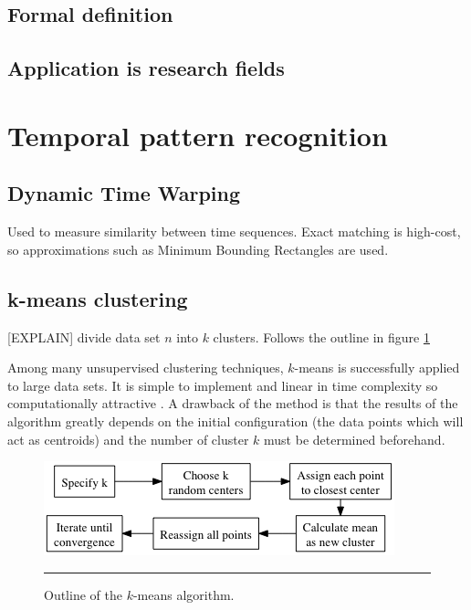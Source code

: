 
\subsection{Formal definition}






\subsection{Application is research fields}



\section{Temporal pattern recognition}

\subsection{Dynamic Time Warping}
Used to measure similarity between time sequences. Exact matching is
high-cost, so approximations such as Minimum Bounding Rectangles are used.

\subsection{k-means clustering}
[EXPLAIN] divide data set $n$ into $k$ clusters. Follows the outline in figure \ref{fig:k_means}

Among many unsupervised clustering techniques, $k$-means is successfully
applied to large data sets. It is simple to implement and linear in time
complexity so computationally attractive \cite{jain1999data}. A drawback of the method is that the results of the algorithm greatly depends on the initial configuration (the data points which will act as centroids) and the number of cluster $k$ must be determined beforehand.

\begin{figure}[htbp]
	\centering
		\includegraphics{./Figures/graphs/k_means.png}
		\rule{35em}{0.5pt}
	\caption[K-means]{Outline of the $k$-means algorithm.}
	\label{fig:k_means}
\end{figure}

